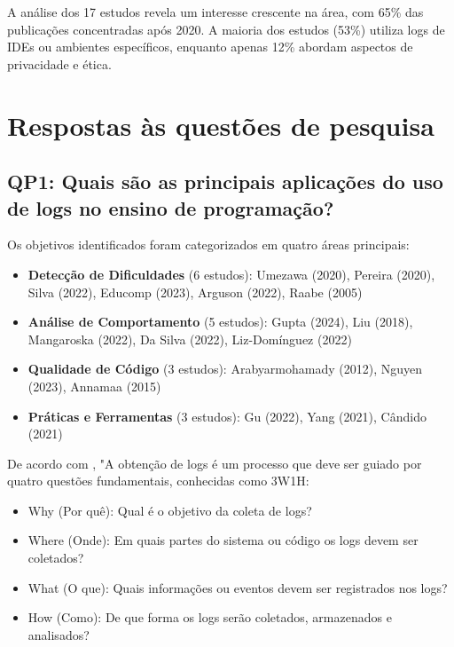 A análise dos 17 estudos revela um interesse crescente na área, com 65\% das publicações concentradas após 2020. A maioria dos estudos (53\%) utiliza logs de IDEs ou ambientes específicos, enquanto apenas 12\% abordam aspectos de privacidade e ética.

\section{Respostas às questões de pesquisa}\label{sec:msl-respostas}

\subsection{QP1: Quais são as principais aplicações do uso de logs no ensino de programação?}\label{subsec:respostas-qp1}

Os objetivos identificados foram categorizados em quatro áreas principais:

\begin{itemize}
    \item \textbf{Detecção de Dificuldades} (6 estudos): Umezawa (2020), Pereira (2020), Silva (2022), Educomp (2023), Arguson (2022), Raabe (2005)
    \item \textbf{Análise de Comportamento} (5 estudos): Gupta (2024), Liu (2018), Mangaroska (2022), Da Silva (2022), Liz-Domínguez (2022)
    \item \textbf{Qualidade de Código} (3 estudos): Arabyarmohamady (2012), Nguyen (2023), Annamaa (2015)
    \item \textbf{Práticas e Ferramentas} (3 estudos): Gu (2022), Yang (2021), Cândido (2021)
\end{itemize}

De acordo com \cite{gu2022logging}, "A obtenção de logs é um processo que deve ser guiado por quatro questões fundamentais, conhecidas como 3W1H:

\begin{itemize}
    \item Why (Por quê): Qual é o objetivo da coleta de logs?
    \item Where (Onde): Em quais partes do sistema ou código os logs devem ser coletados?
    \item What (O que): Quais informações ou eventos devem ser registrados nos logs?
    \item How (Como): De que forma os logs serão coletados, armazenados e analisados?
\end{itemize}

